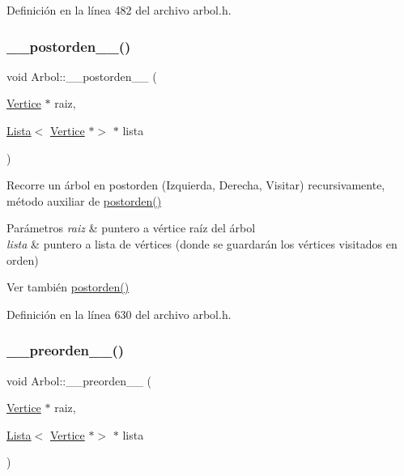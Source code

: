 Definición en la línea 482 del archivo arbol.\+h.

\mbox{\label{classArbol_aea4cc9147a79d74956413a233df1dbe0}} 
\subsubsection{\texorpdfstring{\+\_\+\+\_\+postorden\+\_\+\+\_\+()}{\_\_postorden\_\_()}}
{\footnotesize\ttfamily void Arbol\+::\+\_\+\+\_\+postorden\+\_\+\+\_\+ (\begin{DoxyParamCaption}\item[{\hyperlink{classVertice}{Vertice} $\ast$}]{raiz,  }\item[{\hyperlink{classLista}{Lista}$<$ \hyperlink{classVertice}{Vertice} $\ast$$>$ $\ast$}]{lista }\end{DoxyParamCaption})\hspace{0.3cm}{\ttfamily [protected]}}



Recorre un árbol en postorden (Izquierda, Derecha, Visitar) recursivamente, método auxiliar de \hyperlink{classArbol_a126e7d801dbe214ac39f183c26e9135d}{postorden()} 


\begin{DoxyParams}{Parámetros}
{\em raiz} & puntero a vértice raíz del árbol \\
\hline
{\em lista} & puntero a lista de vértices (donde se guardarán los vértices visitados en orden) \\
\hline
\end{DoxyParams}
\begin{DoxySeeAlso}{Ver también}
\hyperlink{classArbol_a126e7d801dbe214ac39f183c26e9135d}{postorden()} 
\end{DoxySeeAlso}


Definición en la línea 630 del archivo arbol.\+h.

\mbox{\label{classArbol_a707f748c57d51f6b63fe1a605476e49d}} 
\subsubsection{\texorpdfstring{\+\_\+\+\_\+preorden\+\_\+\+\_\+()}{\_\_preorden\_\_()}}
{\footnotesize\ttfamily void Arbol\+::\+\_\+\+\_\+preorden\+\_\+\+\_\+ (\begin{DoxyParamCaption}\item[{\hyperlink{classVertice}{Vertice} $\ast$}]{raiz,  }\item[{\hyperlink{classLista}{Lista}$<$ \hyperlink{classVertice}{Vertice} $\ast$$>$ $\ast$}]{lista }\end{DoxyParamCaption})\hspace{0.3cm}{\ttfamily [protected]}}



